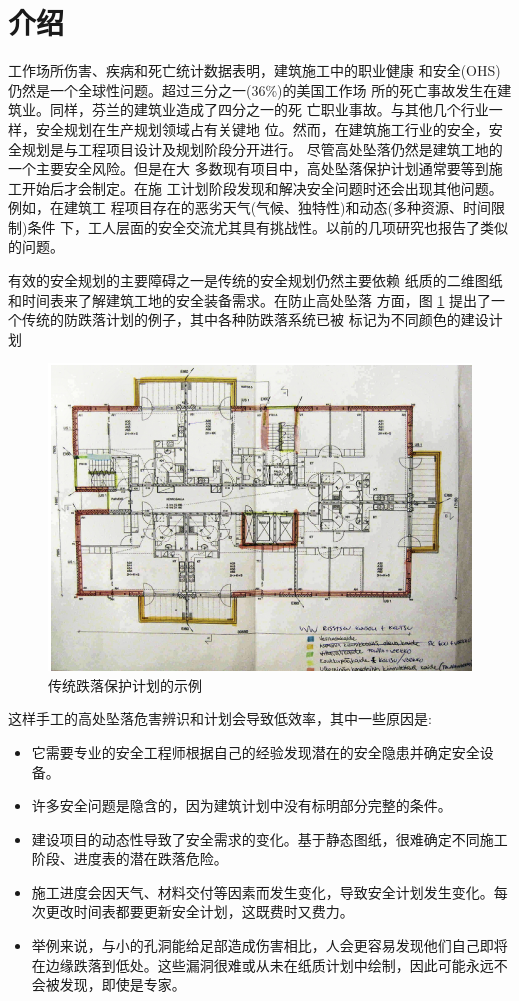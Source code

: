 \section{介绍}
工作场所伤害、疾病和死亡统计数据表明，建筑施工中的职业健康
和安全(OHS)仍然是一个全球性问题。超过三分之一(36\%)的美国工作场
所的死亡事故发生在建筑业。同样，芬兰的建筑业造成了四分之一的死
亡职业事故。与其他几个行业一样，安全规划在生产规划领域占有关键地
位。然而，在建筑施工行业的安全，安全规划是与工程项目设计及规划阶段分开进行。
尽管高处坠落仍然是建筑工地的一个主要安全风险。但是在大
多数现有项目中，高处坠落保护计划通常要等到施工开始后才会制定。在施
工计划阶段发现和解决安全问题时还会出现其他问题。例如，在建筑工
程项目存在的恶劣天气(气候、独特性)和动态(多种资源、时间限制)条件
下，工人层面的安全交流尤其具有挑战性。以前的几项研究也报告了类似
的问题。

有效的安全规划的主要障碍之一是传统的安全规划仍然主要依赖
纸质的二维图纸和时间表来了解建筑工地的安全装备需求。在防止高处坠落
方面，图 \ref{fig:c1f1} 提出了一个传统的防跌落计划的例子，其中各种防跌落系统已被
标记为不同颜色的建设计划

\begin{figure}[thbp!]
    \centering
    \includegraphics[width=0.8\linewidth]{res/c1f1.png}
    \caption{传统跌落保护计划的示例}
    \label{fig:c1f1}
    \end{figure}

这样手工的高处坠落危害辨识和计划会导致低效率，其中一些原因是:

\begin{itemize}
    \item 它需要专业的安全工程师根据自己的经验发现潜在的安全隐患并确定安全设备。
    \item 许多安全问题是隐含的，因为建筑计划中没有标明部分完整的条件。
    \item 建设项目的动态性导致了安全需求的变化。基于静态图纸，很难确定不同施工阶段、进度表的潜在跌落危险。
    \item 施工进度会因天气、材料交付等因素而发生变化，导致安全计划发生变化。每次更改时间表都要更新安全计划，这既费时又费力。
    \item 举例来说，与小的孔洞能给足部造成伤害相比，人会更容易发现他们自己即将在边缘跌落到低处。这些漏洞很难或从未在纸质计划中绘制，因此可能永远不会被发现，即使是专家。
\end{itemize}   


